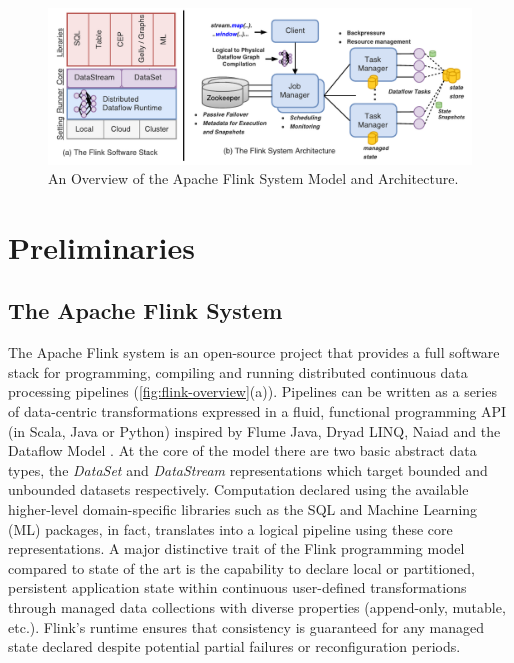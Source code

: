 
\begin{figure}[t!]
\centering
\includegraphics[width=\textwidth]{figures/flinkoverview.pdf}
\caption{An Overview of the Apache Flink System Model and Architecture.} 
\label{fig:flink-overview}
\vspace{-4mm}
\end{figure}

\section{Preliminaries}

\subsection{The Apache Flink System}

The Apache Flink system \cite{CUSTOM:web/Flink} is an open-source project that provides a full software stack for programming, compiling and running distributed continuous data processing pipelines (\autoref{fig:flink-overview}(a)). Pipelines can be written as a series of data-centric transformations expressed in a fluid, functional programming API (in Scala, Java or Python) inspired by Flume Java\cite{chambers2010flumejava}, Dryad LINQ\cite{yu2008dryadlinq}, Naiad\cite{murray2013naiad} and the Dataflow Model \cite{akidau2015dataflow}. At the core of the model there are two basic abstract data types, the \emph{DataSet} and \emph{DataStream} representations which target bounded and unbounded datasets respectively. Computation declared using the available higher-level domain-specific libraries such as the SQL and Machine Learning (ML) packages, in fact, translates into a logical pipeline using these core representations. A major distinctive trait of the Flink programming model compared to state of the art is the capability to declare local or partitioned, persistent application state within continuous user-defined transformations through managed data collections with diverse properties (append-only, mutable, etc.). Flink's runtime ensures that consistency is guaranteed for any managed state declared despite potential partial failures or reconfiguration periods.

